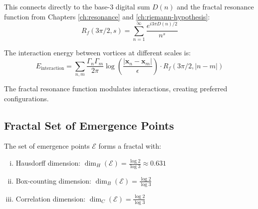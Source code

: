 This connects directly to the base-3 digital sum $D(n)$ and the fractal resonance function from Chapters \ref{ch:resonance} and \ref{ch:riemann-hypothesis}:
\begin{equation}
R_f(3\pi/2, s) = \sum_{n=1}^{\infty} \frac{e^{i3\pi D(n)/2}}{n^s}
\end{equation}

\begin{theorem}\label{thm:scale-resonance}
The interaction energy between vortices at different scales is:
\begin{equation}
E_{\text{interaction}} = \sum_{n,m} \frac{\Gamma_n \Gamma_m}{2\pi} \log\left(\frac{|\mathbf{x}_n - \mathbf{x}_m|}{\epsilon}\right) \cdot R_f(3\pi/2, |n-m|)
\end{equation}

The fractal resonance function modulates interactions, creating preferred configurations.
\end{theorem}

\subsection{Fractal Set of Emergence Points}

\begin{theorem}\label{thm:emergence-fractal}
The set of emergence points $\mathcal{E}$ forms a fractal with:
\begin{enumerate}[(i)]
\item Hausdorff dimension: $\dim_H(\mathcal{E}) = \frac{\log 2}{\log 3} \approx 0.631$
\item Box-counting dimension: $\dim_B(\mathcal{E}) = \frac{\log 2}{\log 3}$
\item Correlation dimension: $\dim_C(\mathcal{E}) = \frac{\log 2}{\log 3}$
\end{enumerate}
\end{theorem}


